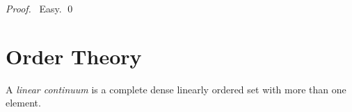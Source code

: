 \begin{proof}
  \pf\ Easy. \qed
\end{proof}

\chapter{Order Theory}

\begin{df}
  A \emph{linear continuum} is a complete dense linearly ordered set with more than one element.
\end{df}
